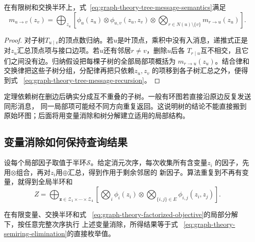 \begin{theorem}[树消息递推]
  \label{thm:graph-theory-tree-message-recursion}
  在有限树和交换半环上，式~\eqref{eq:graph-theory-tree-message-semantics}满足
  \begin{equation}
    m_{u\to v}(z_v)=
    \bigoplus_{z_u}
    \left[
      \phi_u(z_u)\otimes\phi_{u,v}(z_u,z_v)
      \otimes
      \bigotimes_{r\in N(u)\setminus\{v\}}m_{r\to u}(z_u)
    \right].
    \label{eq:graph-theory-tree-message-recursion}
  \end{equation}
\end{theorem}

\begin{proof}
对子树\(T_{u\mid v}\)的顶点数归纳。若\(u\)是叶顶点，乘积中没有入消息，递推式正是
对\(z_u\)汇总顶点项与接口边项。若\(u\)还有邻居\(r\neq v\)，删除\(u\)后各
\(T_{r\mid u}\)互不相交，且它们之间没有边。归纳假设把每棵子树的全部局部项概括为
\(m_{r\to u}(z_u)\)。结合律和交换律把这些子树分组，分配律再把只依赖\(z_u,z_v\)
的项移到各子树汇总之外，便得到式
~\eqref{eq:graph-theory-tree-message-recursion}。
\end{proof}

定理依赖树在删边后确实分成互不重叠的子树。一般有环图若直接沿原边反复发送同形消息，
同一局部项可能经不同方向重复返回。这说明树的结论不能直接搬到原始环图；后面将用变量消除和树分解建立适用的局部结构。

\subsection{变量消除如何保持查询结果}

设每个局部因子取值于半环\(\mathcal{S}\)。给定消元次序，每次收集所有含变量\(z_i\)
的因子，先用\(\otimes\)组合，再对\(z_i\)用\(\oplus\)汇总，得到作用于剩余邻居的
新因子。算法重复到不再有变量，就得到全局半环和
\begin{equation}
  Z=\bigoplus_{\bm{z}\in\mathcal{Z}_1\times\cdots\times\mathcal{Z}_4}
  \left[
    \bigotimes_i\phi_i(z_i)
    \otimes
    \bigotimes_{\{i,j\}\in E}\phi_{i,j}(z_i,z_j)
  \right].
  \label{eq:graph-theory-semiring-elimination}
\end{equation}

\begin{theorem}[半环变量消除的正确性]
  \label{thm:graph-theory-semiring-elimination}
  在有限变量、交换半环和式
  ~\eqref{eq:graph-theory-factorized-objective}的局部分解下，按任意完整次序执行
  上述变量消除，所得结果等于式
  ~\eqref{eq:graph-theory-semiring-elimination}的直接枚举值。
\end{theorem}

